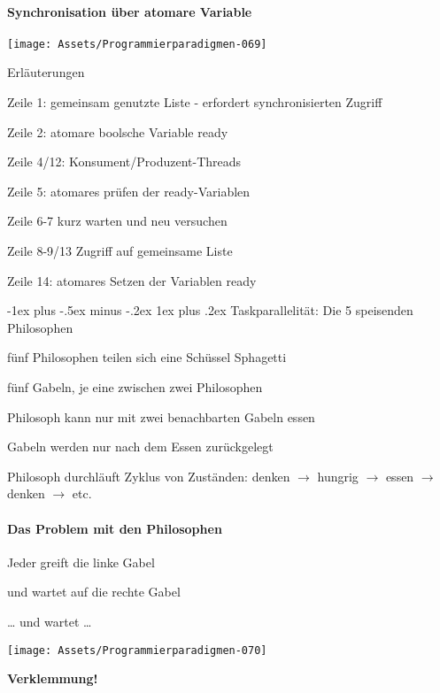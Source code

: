 \documentclass[10pt]{article}
\makeatletter
\renewcommand{\subsubsection}{\@startsection{subsubsection}{3}{0mm}%
                                {-1ex plus -.5ex minus -.2ex}%
                                {1ex plus .2ex}%
                                {\normalfont\small\bfseries}}
\makeatother
\begin{document}
\paragraph{Synchronisation über atomare Variable}
\begin{center}
  \texttt{[image: Assets/Programmierparadigmen-069]}
\end{center}
Erläuterungen
\begin{itemize*}
  \item Zeile 1: gemeinsam genutzte Liste - erfordert synchronisierten Zugriff
  \item Zeile 2: atomare boolsche Variable ready
  \item Zeile 4/12: Konsument/Produzent-Threads
  \item Zeile 5: atomares prüfen der ready-Variablen
  \item Zeile 6-7 kurz warten und neu versuchen
  \item Zeile 8-9/13 Zugriff auf gemeinsame Liste
  \item Zeile 14: atomares Setzen der Variablen ready
\end{itemize*}

\subsubsection{Taskparallelität: Die 5 speisenden Philosophen}
\begin{itemize*}
  \item fünf Philosophen teilen sich eine Schüssel Sphagetti
  \item fünf Gabeln, je eine zwischen zwei Philosophen
  \item Philosoph kann nur mit zwei benachbarten Gabeln essen
  \item Gabeln werden nur nach dem Essen zurückgelegt
  \item Philosoph durchläuft Zyklus von Zuständen: denken $\rightarrow$ hungrig $\rightarrow$ essen $\rightarrow$ denken $\rightarrow$ etc.
\end{itemize*}

\paragraph{Das Problem mit den Philosophen}
\begin{itemize*}
  \item Jeder greift die linke Gabel
  \item und wartet auf die rechte Gabel
  \item … und wartet …
\end{itemize*}
\begin{center}
  \texttt{[image: Assets/Programmierparadigmen-070]}
\end{center}
\color{orange} \textbf{Verklemmung!} \color{black}
\end{document}

